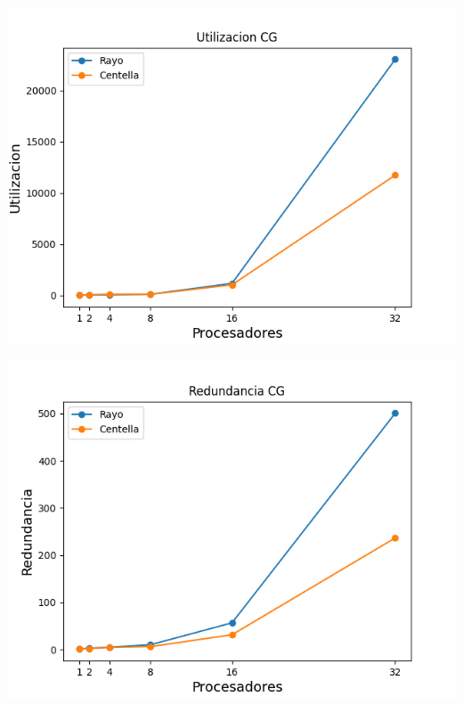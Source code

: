 \begin{center}
 \centering
  \begin{minipage}[b]{.49\textwidth}
  \includegraphics[width=1\linewidth]{plots/utilizacion-cg.png}
 \end{minipage}
 \begin{minipage}[b]{.49\textwidth}
  \includegraphics[width=1\linewidth]{plots/redundancy-cg.png}
    \label{cg:redundancia}
 \end{minipage}
\end{center}

